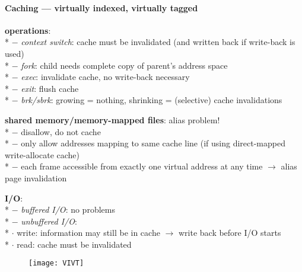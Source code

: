 \paragraph{Caching --- virtually indexed, virtually tagged}
\begin{items}
  \item \textbf{operations}: \\*
    $ - $ \emph{context switch}: cache must be invalidated (and written back if write-back is used) \\*
    $ - $ \emph{fork}: child needs complete copy of parent's address space \\*
    $ - $ \emph{exec}: invalidate cache, no write-back necessary \\*
    $ - $ \emph{exit}: flush cache \\*
    $ - $ \emph{brk/sbrk}: growing = nothing, shrinking = (selective) cache invalidations
  \item \textbf{shared memory/memory-mapped files}: alias problem! \\*
    $ - $ disallow, do not cache \\*
    $ - $ only allow addresses mapping to same cache line (if using direct-mapped write-allocate cache) \\*
    $ - $ each frame accessible from exactly one virtual address at any time $ \to $ alias page invalidation
  \item \textbf{I/O}: \\*
    $ - $ \emph{buffered I/O}: no problems \\*
    $ - $ \emph{unbuffered I/O}: \\*
      \phantom{$ - $} $ \cdot $ write: information may still be in cache $ \to $ write back before I/O starts \\*
      \phantom{$ - $} $ \cdot $ read: cache must be invalidated
\end{items}
\begin{figure}[H]\centering\label{VIVT}\texttt{[image: VIVT]}\end{figure}

